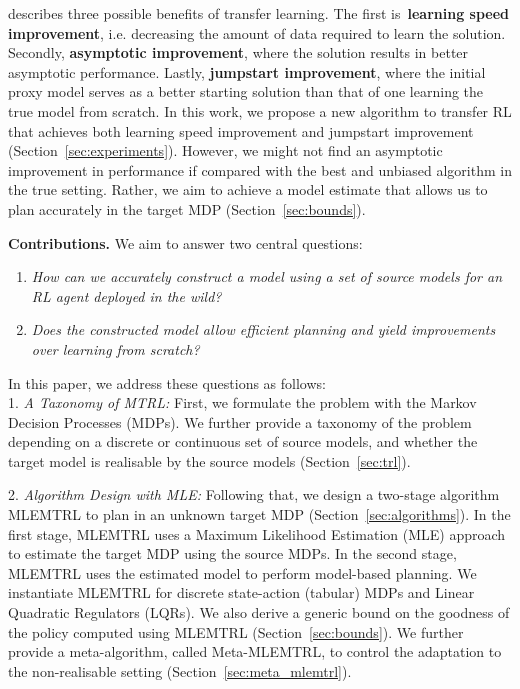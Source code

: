 \citep{langley2006transfer} describes three possible benefits of transfer learning. The first is~\textbf{learning speed improvement}, i.e. decreasing the amount of data required to learn the solution. Secondly, \textbf{asymptotic improvement}, where the solution results in better asymptotic performance. Lastly, \textbf{jumpstart improvement}, where the initial proxy model serves as a better starting solution than that of one learning the true model from scratch. In this work, we propose a new algorithm to transfer RL that achieves both learning speed improvement and jumpstart improvement (Section~\ref{sec:experiments}). However, we might not find an asymptotic improvement in performance if compared with the best and unbiased algorithm in the true setting. Rather, we aim to achieve a model estimate that allows us to plan accurately in the target MDP (Section~\ref{sec:bounds}).%

\noindent\textbf{Contributions.} We aim to answer two central questions:
\begin{enumerate}
    \item  \emph{How can we accurately construct a model using a set of source models for an RL agent deployed in the wild?} 
    \item \emph{Does the constructed model allow efficient planning and yield improvements over learning from scratch?}
\end{enumerate}
In this paper, we address these questions as follows:\\

1. \textit{A Taxonomy of MTRL:} First, we formulate the problem with the Markov Decision Processes (MDPs). %
We further provide a taxonomy of the problem depending on a discrete or continuous set of source models, and whether the target model is realisable by the source models (Section~\ref{sec:trl}).%

2. \textit{Algorithm Design with MLE:} Following that, we design a two-stage algorithm MLEMTRL to plan in an unknown target MDP (Section~\ref{sec:algorithms}). In the first stage, MLEMTRL uses a Maximum Likelihood Estimation (MLE) approach to estimate the target MDP using the source MDPs. In the second stage, MLEMTRL uses the estimated model to perform model-based planning. We instantiate MLEMTRL for discrete state-action (tabular) MDPs and Linear Quadratic Regulators (LQRs). We also derive a generic bound on the goodness of the policy computed using MLEMTRL (Section~\ref{sec:bounds}). We further provide a meta-algorithm, called Meta-MLEMTRL, to control the adaptation to the non-realisable setting (Section~\ref{sec:meta_mlemtrl}).%

